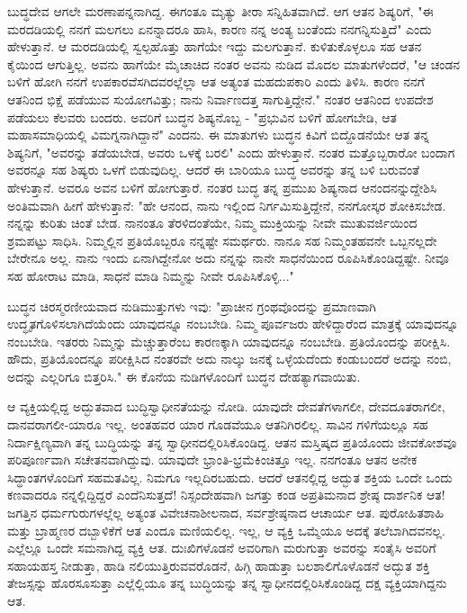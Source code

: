 ಬುದ್ಧದೇವ ಆಗಲೇ ಮರಣಾಪನ್ನನಾಗಿದ್ದ. ಈಗಂತೂ ಮೃತ್ಯು ತೀರಾ ಸನ್ನಿಹಿತವಾಗಿದೆ. ಆಗ ಆತನ ಶಿಷ್ಯರಿಗೆ, "ಈ ಮರದಡಿಯಲ್ಲಿ ನನಗೆ ಮಲಗಲು ಏನನ್ನಾದರೂ ಹಾಸಿ, ಕಾರಣ ನನ್ನ ಅಂತ್ಯ ಬಂತೆಂದು ನನಗನ್ನಿಸುತ್ತಿದೆ" ಎಂದು ಹೇಳುತ್ತಾನೆ. ಆ ಮರದಡಿಯಲ್ಲಿ ಸ್ವಲ್ಪಹೊತ್ತು ಹಾಗೆಯೇ ಇದ್ದು ಮಲಗುತ್ತಾನೆ. ಕುಳಿತುಕೊಳ್ಳಲೂ ಸಹ ಆತನ ಕೈಯಿಂದ ಆಗುತ್ತಿಲ್ಲ. ಅವನು ಹಾಗೆಯೇ ಮೈಚಾಚಿದ ನಂತರ ಅವನು ನುಡಿದ ಮೊದಲ ಮಾತುಗಳೆಂದರೆ, "ಆ ಚಂಡನ ಬಳಿಗೆ ಹೋಗಿ ನನಗೆ ಉಪಕಾರವೆಸಗಿದವರಲ್ಲೆಲ್ಲಾ ಆತ ಅತ್ಯಂತ ಮಹದುಪಕಾರಿ ಎಂದು ತಿಳಿಸಿ. ಕಾರಣ ನನಗೆ ಆತನಿಂದ ಭಿಕ್ಷೆ ಪಡೆಯುವ ಸುಯೋಗವಿತ್ತು; ನಾನು ನಿರ್ವಾಣದತ್ತ ಸಾಗುತ್ತಿದ್ದೇನೆ." ನಂತರ ಆತನಿಂದ ಉಪದೇಶ ಪಡೆಯಲು ಕೆಲವರು ಬಂದರು. ಅವರಿಗೆ ಬುದ್ಧನ ಶಿಷ್ಯನೊಬ್ಬ - "ಪ್ರಭುವಿನ ಬಳಿಗೆ ಹೋಗಬೇಡಿ, ಆತ ಮಹಾಸಮಾಧಿಯಲ್ಲಿ ವಿಮಗ್ನನಾಗಿದ್ದಾನೆ" ಎಂದನು. ಈ ಮಾತುಗಳು ಬುದ್ಧನ ಕಿವಿಗೆ ಬಿದ್ದೊಡನೆಯೇ ಆತ ತನ್ನ ಶಿಷ್ಯನಿಗೆ, "ಅವರನ್ನು ತಡೆಯಬೇಡ, ಅವರು ಒಳಕ್ಕೆ ಬರಲಿ" ಎಂದು ಹೇಳುತ್ತಾನೆ. ನಂತರ ಮತ್ತೊಬ್ಬರಾರೋ ಬಂದಾಗ ಅವರನ್ನೂ ಸಹ ಶಿಷ್ಯರು ಒಳಗೆ ಬಿಡುವುದಿಲ್ಲ. ಆದರೆ ಈ ಬಾರಿಯೂ ಬುದ್ಧ ಅವರನ್ನು ತನ್ನ ಬಳಿ ಬರುವಂತೆ ಹೇಳುತ್ತಾನೆ. ಅವರೂ ಅವನ ಬಳಿಗೆ ಹೋಗುತ್ತಾರೆ. ನಂತರ ಬುದ್ಧ ತನ್ನ ಪ್ರಮುಖ ಶಿಷ್ಯನಾದ ಆನಂದನನ್ನುದ್ದೇಶಿಸಿ ಅಂತಿಮವಾಗಿ ಹೀಗೆ ಹೇಳುತ್ತಾನೆ: "ಹೇ ಆನಂದ, ನಾನು ಇಲ್ಲಿಂದ ನಿರ್ಗಮಿಸುತ್ತಿದ್ದೇನೆ, ನನಗೋಸ್ಕರ ಶೋಕಿಸಬೇಡ. ನನ್ನನ್ನು ಕುರಿತು ಚಿಂತೆ ಬೇಡ. ನಾನಂತೂ ತೆರಳಿದಂತೆಯೇ, ನಿಮ್ಮ ಮುಕ್ತಿಯನ್ನು ನೀವೇ ಮುತುವರ್ಜಿಯಿಂದ ಶ್ರಮಪಟ್ಟು ಸಾಧಿಸಿ. ನಿಮ್ಮಲ್ಲಿನ ಪ್ರತಿಯೊಬ್ಬರೂ ನನ್ನಷ್ಟೇ ಸಮರ್ಥರು. ನಾನೂ ಸಹ ನಿಮ್ಮಂತಹವನೇ ಒಬ್ಬನಲ್ಲದೇ ಬೇರೇನೂ ಅಲ್ಲ. ನಾನು ಇಂದು ಏನಾಗಿದ್ದೇನೋ ಅದು ನನ್ನನ್ನು ನಾನೇ ಸಾಧನೆಯಿಂದ ರೂಪಿಸಿಕೊಂಡಿದ್ದಷ್ಟೇ. ನೀವೂ ಸಹ ಹೋರಾಟ ಮಾಡಿ, ಸಾಧನೆ ಮಾಡಿ ನಿಮ್ಮನ್ನು ನೀವೇ ರೂಪಿಸಿಕೊಳ್ಳಿ..."

ಬುದ್ಧನ ಚಿರಸ್ಮರಣೀಯವಾದ ನುಡಿಮುತ್ತುಗಳು ಇವು: "ಪ್ರಾಚೀನ ಗ್ರಂಥವೊಂದನ್ನು ಪ್ರಮಾಣವಾಗಿ ಉದ್ಧೃತಗೊಳಿಸಲಾಗಿದೆಯೆಂದು ಯಾವುದನ್ನೂ ನಂಬಬೇಡಿ. ನಿಮ್ಮ ಪೂರ್ವಜರು ಹೇಳಿದ್ದಾರೆಂದ ಮಾತ್ರಕ್ಕೆ ಯಾವುದನ್ನೂ ನಂಬಬೇಡಿ. ಇತರರು ನಿಮ್ಮನ್ನು ಮೆಚ್ಚುತ್ತಾರೆಂಬ ಕಾರಣಕ್ಕಾಗಿ ಯಾವುದನ್ನೂ ನಂಬಬೇಡಿ. ಪ್ರತಿಯೊಂದನ್ನು ಪರೀಕ್ಷಿಸಿ. ಹೌದು, ಪ್ರತಿಯೊಂದನ್ನೂ ಪರೀಕ್ಷಿಸಿದ ನಂತರವೇ ಅದು ನಾಲ್ಕು ಜನಕ್ಕೆ ಒಳ್ಳೆಯದೆಂದು ಕಂಡುಬಂದರೆ ಅದನ್ನು ನಂಬಿ, ಅದನ್ನು ಎಲ್ಲರಿಗೂ ಬಿತ್ತರಿಸಿ." ಈ ಕೊನೆಯ ನುಡಿಗಳೊಂದಿಗೆ ಬುದ್ಧನ ದೇಹತ್ಯಾಗವಾಯಿತು.

ಆ ವ್ಯಕ್ತಿಯಲ್ಲಿದ್ದ ಅದ್ಭುತವಾದ ಬುದ್ಧಿಸ್ವಾಧೀನತೆಯನ್ನು ನೋಡಿ. ಯಾವುದೇ ದೇವತೆಗಳಾಗಲೀ, ದೇವದೂತರಾಗಲೀ, ದಾನವರಾಗಲೀ-ಯಾರೂ ಇಲ್ಲ. ಅಂತಹವರ ಯಾರ ಗೊಡವೆಯೂ ಆತನಿಗಿರಲಿಲ್ಲ. ಸಾವಿನ ಗಳಿಗೆಯಲ್ಲೂ ಸಹ ನಿರ್ದಾಕ್ಷಿಣ್ಯವಾಗಿ ತನ್ನ ಬುದ್ಧಿಯನ್ನು ತನ್ನ ಸ್ವಾಧೀನದಲ್ಲಿರಿಸಿಕೊಂಡಿದ್ದ. ಆತನ ಮಸ್ತಿಷ್ಕದ ಪ್ರತಿಯೊಂದು ಜೀವಕೋಶವೂ ಪರಿಪೂರ್ಣವಾಗಿ ಸಚೇತನವಾಗಿದ್ದುವು. ಯಾವುದೇ ಭ್ರಾಂತಿ-ಭ್ರಮೆಕಿಂಚಿತ್ತೂ ಇಲ್ಲ. ನನಗಂತೂ ಆತನ ಅನೇಕ ಸಿದ್ಧಾಂತಗಳೊಂದಿಗೆ ಸಹಮತವಿಲ್ಲ. ನಿಮಗೂ ಇಲ್ಲದಿರಬಹುದು. ಆದರೆ ಆತನಲ್ಲಿದ್ದ ಅದ್ಭುತ ಶಕ್ತಿಯ ಒಂದೇ ಒಂದು ಕಣವಾದರೂ ನನ್ನಲ್ಲಿದ್ದಿದ್ದರೆ ಎಂದೆನಿಸುತ್ತದೆ! ನಿಸ್ಸಂದೇಹವಾಗಿ ಜಗತ್ತು ಕಂಡ ಅಪ್ರತಿಮನಾದ ಶ್ರೇಷ್ಠ ದಾರ್ಶನಿಕ ಆತ! ಜಗತ್ತಿನ ಧರ್ಮಗುರುಗಳಲ್ಲೆಲ್ಲ ಅತ್ಯಂತ ವಿವೇಚನಾಶೀಲನಾದ, ಸರ್ವಶ್ರೇಷ್ಠನಾದ ಆಚಾರ್ಯ ಆತ. ಪುರೋಹಿತಶಾಹಿ ಮತ್ತು ಬ್ರಾಹ್ಮಣರ ದಬ್ಬಾಳಿಕೆಗೆ ಆತ ಎಂದೂ ಮಣಿಯಲಿಲ್ಲ. ಇಲ್ಲ, ಆ ವ್ಯಕ್ತಿ ಒಮ್ಮೆಯೂ ಅದಕ್ಕೆ ತಲೆಬಾಗಿದವನಲ್ಲ. ಎಲ್ಲೆಲ್ಲೂ ಒಂದೇ ಸಮನಾಗಿದ್ದ ವ್ಯಕ್ತಿ ಆತ. ದುಃಖಿಗಳೊಡನೆ ಅವರಿಗಾಗಿ ಮರುಗುತ್ತಾ ಅವರನ್ನು ಸಂತೈಸಿ ಅವರಿಗೆ ಸಹಾಯಹಸ್ತ ನೀಡುತ್ತಾ, ಹಾಡಿ ನಲಿಯುತ್ತಿರುವವರೊಡನೆ, ಹಿಗ್ಗಿ ಹಾಡುತ್ತಾ ಬಲಶಾಲಿಗೊಳೊಡನೆ ಅದ್ಭುತ ಶಕ್ತಿ ತೇಜಸ್ಸನ್ನು ಹೊರಸೂಸುತ್ತಾ ಎಲ್ಲೆಲ್ಲಿಯೂ ತನ್ನ ಬುದ್ಧಿಯನ್ನು ತನ್ನ ಸ್ವಾಧೀನದಲ್ಲಿರಿಸಿಕೊಂಡಿದ್ದ ದಕ್ಷ ವ್ಯಕ್ತಿಯಾಗಿದ್ದನು ಆತ.

